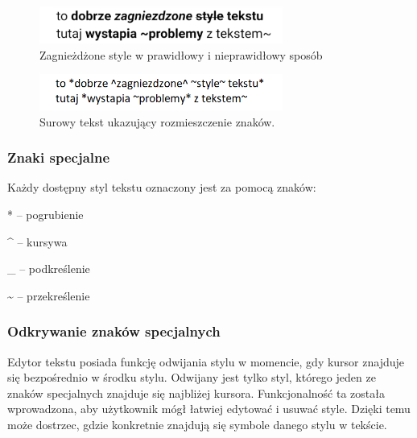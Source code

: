 \begin{figure}[ht]
    \centering
    \includegraphics[width=8cm]{images/style.png}
    \caption{Zagnieżdżone style w prawidłowy i nieprawidłowy sposób}
    \vspace{3mm}
\end{figure}

\begin{figure}[ht]
    \centering
    \includegraphics[width=8cm]{images/style_surowy_tekst.png}
    \caption{Surowy tekst ukazujący rozmieszczenie znaków.}
    \vspace{3mm}
\end{figure}

\subsubsection{Znaki specjalne}

Każdy dostępny styl tekstu oznaczony jest za pomocą znaków:

\begin{compactitem}
    
    \item [*] \hspace{1mm} -- pogrubienie
    \item [\^{}] \hspace{1mm} -- kursywa
    \item [\_{}] \hspace{1mm} -- podkreślenie
    \item [\~{}] \hspace{1mm} -- przekreślenie
\end{compactitem}

\subsubsection{Odkrywanie znaków specjalnych}

Edytor tekstu posiada funkcję odwijania stylu w momencie, gdy kursor znajduje się bezpośrednio w środku stylu. Odwijany jest tylko styl, którego jeden ze znaków specjalnych znajduje się najbliżej kursora. Funkcjonalność ta została wprowadzona, aby użytkownik mógł łatwiej edytować i usuwać style.
Dzięki temu może dostrzec, gdzie konkretnie znajdują się symbole danego stylu w tekście.


